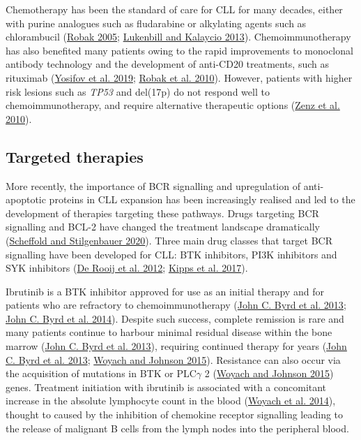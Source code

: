\documentclass[11pt, a4paper, twosided]{book}
\begin{document}
Chemotherapy has been the standard of care for CLL for many decades, either with purine analogues such as fludarabine or alkylating agents such as chlorambucil (\protect\hyperlink{ref-Robak2005}{Robak 2005}; \protect\hyperlink{ref-Lukenbill2013}{Lukenbill and Kalaycio 2013}). Chemoimmunotherapy has also benefited many patients owing to the rapid improvements to monoclonal antibody technology and the development of anti-CD20 treatments, such as rituximab (\protect\hyperlink{ref-Yosifov2019}{Yosifov et al. 2019}; \protect\hyperlink{ref-Robak2010}{Robak et al. 2010}). However, patients with higher risk lesions such as \emph{TP53} and del(17p) do not respond well to chemoimmunotherapy, and require alternative therapeutic options (\protect\hyperlink{ref-Zenz2010}{Zenz et al. 2010}).

\hypertarget{intro-targeted-therapies}{%
\subsection{Targeted therapies}\label{intro-targeted-therapies}}

More recently, the importance of BCR signalling and upregulation of anti-apoptotic proteins in CLL expansion has been increasingly realised and led to the development of therapies targeting these pathways. Drugs targeting BCR signalling and BCL-2 have changed the treatment landscape dramatically (\protect\hyperlink{ref-Scheffold2020}{Scheffold and Stilgenbauer 2020}). Three main drug classes that target BCR signalling have been developed for CLL: BTK inhibitors, PI3K inhibitors and SYK inhibitors (\protect\hyperlink{ref-Rooij2012}{De Rooij et al. 2012}; \protect\hyperlink{ref-Kipps2017}{Kipps et al. 2017}).

Ibrutinib is a BTK inhibitor approved for use as an initial therapy and for patients who are refractory to chemoimmunotherapy (\protect\hyperlink{ref-Byrd2013}{John C. Byrd et al. 2013}; \protect\hyperlink{ref-Byrd2014}{John C. Byrd et al. 2014}). Despite such success, complete remission is rare and many patients continue to harbour minimal residual disease within the bone marrow (\protect\hyperlink{ref-Byrd2013}{John C. Byrd et al. 2013}), requiring continued therapy for years (\protect\hyperlink{ref-Byrd2013}{John C. Byrd et al. 2013}; \protect\hyperlink{ref-Woyach2015}{Woyach and Johnson 2015}). Resistance can also occur via the acquisition of mutations in BTK or PLC\(\gamma\) 2 (\protect\hyperlink{ref-Woyach2015}{Woyach and Johnson 2015}) genes. Treatment initiation with ibrutinib is associated with a concomitant increase in the absolute lymphocyte count in the blood (\protect\hyperlink{ref-Woyach2014}{Woyach et al. 2014}), thought to caused by the inhibition of chemokine receptor signalling leading to the release of malignant B cells from the lymph nodes into the peripheral blood.
\end{document}
